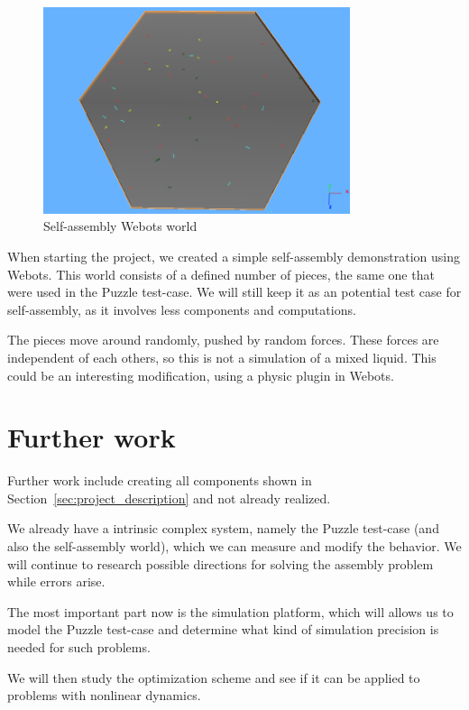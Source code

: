 \documentclass[letterpaper, oneside]{article}
\begin{document}
\begin{figure}[h!]
	\centering
		\includegraphics[width=9cm]{img/webots_self_assembly_random.png}
	\caption{Self-assembly Webots world}
	\label{fig:img_webots_self_assembly_random}
\end{figure}

When starting the project, we created a simple self-assembly demonstration using Webots. This world consists of a defined number of pieces, the same one that were used in the Puzzle test-case. We will still keep it as an potential test case for self-assembly, as it involves less components and computations.

The pieces move around randomly, pushed by random forces. These forces are independent of each others, so this is not a simulation of a mixed liquid. This could be an interesting modification, using a physic plugin in Webots.

\section{Further work} %
\label{sec:further_work}
Further work include creating all components shown in Section~\ref{sec:project_description} and not already realized.

We already have a intrinsic complex system, namely the Puzzle test-case (and also the self-assembly world), which we can measure and modify the behavior. We will continue to research possible directions for solving the assembly problem while errors arise.

The most important part now is the simulation platform, which will allows us to model the Puzzle test-case and determine what kind of simulation precision is needed for such problems.

We will then study the optimization scheme and see if it can be applied to problems with nonlinear dynamics.


\end{document}
